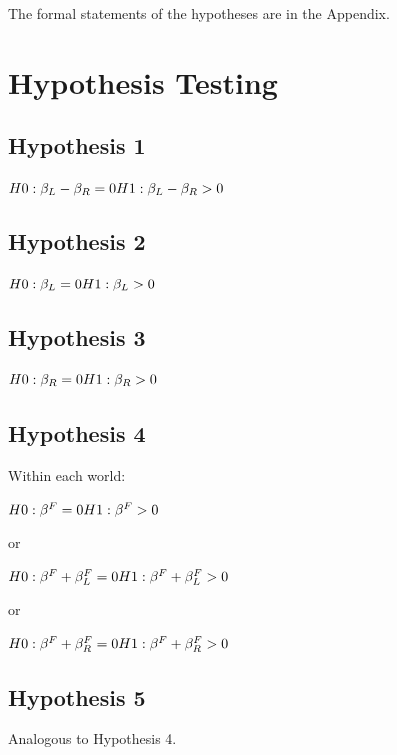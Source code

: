 The formal statements of the hypotheses are in the Appendix.

\clearpage
\pagebreak



\clearpage
\pagebreak

\appendix
\section{Hypothesis Testing}
\label{section:appendixa}
\setcounter{figure}{0}
\setcounter{table}{0}
\renewcommand{\thefigure}{A.\arabic{figure}}
\renewcommand{\thetable}{A.\arabic{table}}

\subsection{Hypothesis 1}
$H0: \beta_L - \beta_R = 0 \\
H1: \beta_L - \beta_R > 0$

\subsection{Hypothesis 2}
$H0: \beta_L = 0 \\
H1: \beta_L > 0$

\subsection{Hypothesis 3}
$H0: \beta_R = 0 \\
H1: \beta_R > 0$

\subsection{Hypothesis 4}
Within each world:

\noindent $H0: \beta^F = 0 \\
H1: \beta^F > 0$

\noindent or

\noindent $H0: \beta^F + \beta_L^F = 0 \\
H1: \beta^F + \beta_L^F > 0$

\noindent or

\noindent $H0: \beta^F + \beta_R^F = 0 \\
H1: \beta^F + \beta_R^F > 0$

\subsection{Hypothesis 5}
Analogous to Hypothesis 4.

